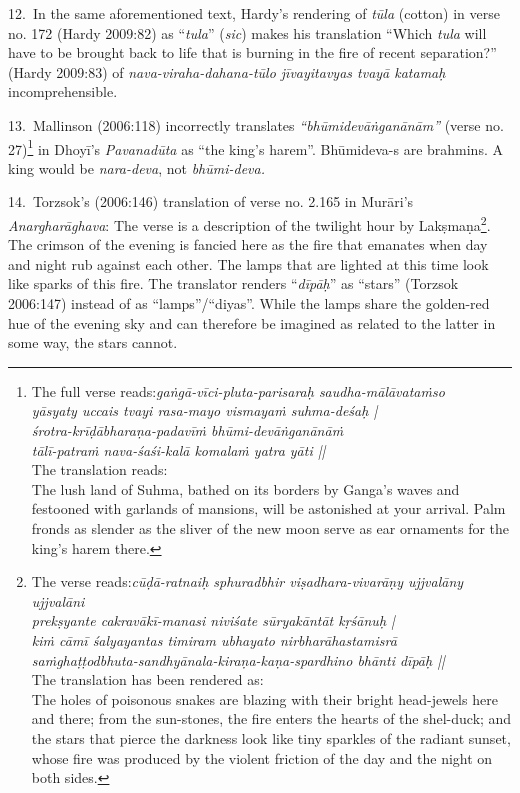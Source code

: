 \newpage

12.~In the same aforementioned text, Hardy’s rendering of \textsl{tūla} (cotton) in verse no. 172 (Hardy 2009:82) as “\textsl{tula}” (\textsl{sic}) makes his translation “Which \textsl{tula} will have to be brought back to life that is burning in the fire of recent separation?” (Hardy 2009:83) of \textsl{nava-viraha-dahana-tūlo jīvayitavyas tvayā katamaḥ} incomprehensible. 

13.~Mallinson (2006:118) incorrectly translates \textsl{“bhūmidevāṅganānām”} (verse no. 27)\footnote[8]{The full verse reads:\textsl{gaṅgā-vīci-pluta-parisaraḥ saudha-mālāvataṁso}\\
\textsl{yāsyaty uccais tvayi rasa-mayo vismayaṁ suhma-deśaḥ |}\\
\textsl{śrotra-krīḍābharaṇa-padavīṁ bhūmi-devāṅganānāṁ}\\
\textsl{tālī-patraṁ nava-śaśi-kalā komalaṁ yatra yāti ||}\\
The translation reads:\\
The lush land of Suhma, bathed on its borders by Ganga’s waves and festooned with garlands of mansions, will be astonished at your arrival. Palm fronds as slender as the sliver of the new moon serve as ear ornaments for the king’s harem there.} in Dhoyī’s \textsl{Pavanadūta} as “the king’s harem”. Bhūmideva-s are brahmins. A king would be \textsl{nara-deva}, not \textsl{bhūmi-deva.}

14.~Torzsok’s (2006:146) translation of verse no. 2.165 in Murāri’s \textsl{Anargharāghava}: The verse is a description of the twilight hour by Lakṣmaṇa\footnote[9]{The verse reads:\textsl{cūḍā-ratnaiḥ sphuradbhir viṣadhara-vivarāṇy ujjvalāny ujjvalāni}\\
\textsl{prekṣyante cakravākī-manasi niviśate sūryakāntāt kṛśānuḥ |}\\
\textsl{kiṁ cāmī śalyayantas timiram ubhayato nirbharāhastamisrā}\\
\textsl{saṁghaṭṭodbhuta-sandhyānala-kiraṇa-kaṇa-spardhino bhānti dīpāḥ ||}\\
The translation has been rendered as:\\
The holes of poisonous snakes are blazing with their bright head-jewels here and there; from the sun-stones, the fire enters the hearts of the shel-duck; and the stars that pierce the darkness look like tiny sparkles of the radiant sunset, whose fire was produced by the violent friction of the day and the night on both sides.}. The crimson of the evening is fancied here as the fire that emanates when day and night rub against each other. The lamps that are lighted at this time look like sparks of this fire. The translator renders “\textsl{dīpāḥ}” as “stars” (Torzsok 2006:147) instead of as “lamps”/“diyas”. While the lamps share the golden-red hue of the evening sky and can therefore be imagined as related to the latter in some way, the stars cannot. 

